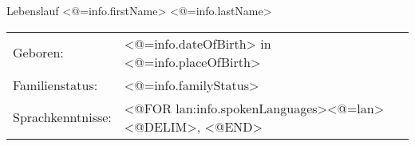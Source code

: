 \documentclass[12pt]{article}
\begin{document}
\begin{center}
{\large Lebenslauf <@=info.firstName> <@=info.lastName>}
\end{center}
\begin{tabular}{ll}
Geboren: &  <@=info.dateOfBirth> in <@=info.placeOfBirth> \\
Familienstatus: & <@=info.familyStatus>\\
Sprachkenntnisse: & <@FOR lan:info.spokenLanguages><@=lan><@DELIM>, <@END>
\end{tabular}
\end{document}

